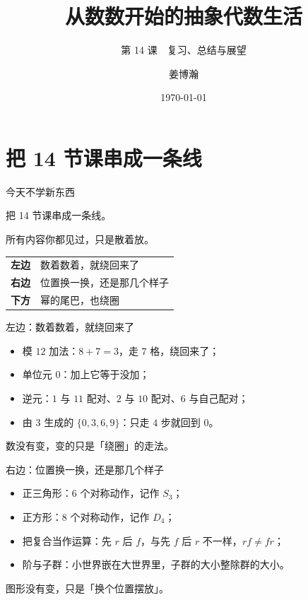 \documentclass[10pt]{beamer}
\title{从数数开始的抽象代数生活}
\subtitle{第 14 课　复习、总结与展望}
\author{姜博瀚}
\institute{厦门大学附属实验中学}
\date{\today}
\begin{document}
\begin{frame}
  \titlepage
\end{frame}

\section{把 14 节课串成一条线}

\begin{frame}{今天不学新东西}
  \begin{center}
    {\large 把 14 节课串成一条线。}
  \end{center}
  \pause
  \begin{center}
    {\large 所有内容你都见过，只是散着放。}\\[0.9em]
    \begin{tabular}{@{}r@{\quad}l@{}}
      \textcolor{textgreen}{\bfseries 左边} & 数着数着，就绕回来了 \\
      \textcolor{textgreen}{\bfseries 右边} & 位置换一换，还是那几个样子 \\
      \textcolor{textgreen}{\bfseries 下方} & 幂的尾巴，也绕圈 \\
    \end{tabular}
  \end{center}
\end{frame}

\begin{frame}{左边：数着数着，就绕回来了}
  \begin{itemize}
    \item 模 \(12\) 加法：\(8+7=3\)，走 \(7\) 格，绕回来了；
    \item 单位元 \(0\)：加上它等于没加；
    \item 逆元：\(1\) 与 \(11\) 配对、\(2\) 与 \(10\) 配对、\(6\) 与自己配对；
    \item 由 \(3\) 生成的 \(\{0,3,6,9\}\)：只走 \(4\) 步就回到 \(0\)。
  \end{itemize}
  \pause
  \begin{center}
    {\large 数没有变，变的只是「绕圈」的走法。}
  \end{center}
\end{frame}

\begin{frame}{右边：位置换一换，还是那几个样子}
  \begin{itemize}
    \item 正三角形：\(6\) 个对称动作，记作 \(S_3\)；
    \item 正方形：\(8\) 个对称动作，记作 \(D_4\)；
    \item 把复合当作运算：先 \(r\) 后 \(f\)，与先 \(f\) 后 \(r\) 不一样，\(rf\neq fr\)；
    \item 阶与子群：小世界嵌在大世界里，子群的大小整除群的大小。
  \end{itemize}
  \pause
  \begin{center}
    {\large 图形没有变，只是「换个位置摆放」。}
  \end{center}
\end{frame}
\end{document}
